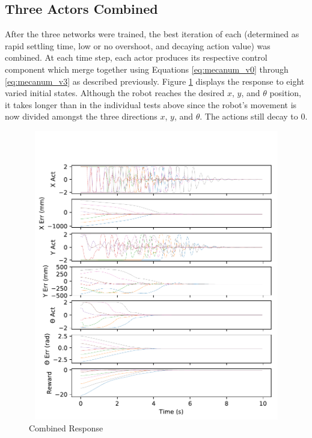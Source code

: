 \subsection{Three Actors Combined}
After the three networks were trained, the best iteration of each (determined as rapid settling time, low or no overshoot, and decaying action value) was combined. At each time step, each actor produces its respective control component which merge together using Equations \ref{eq:mecanum_v0} through \ref{eq:mecanum_v3} as described previously. Figure \ref{fig:three_actor_response} displays the response to eight varied initial states. Although the robot reaches the desired $x$, $y$, and $\theta$ position, it takes longer than in the individual tests above since the robot's movement is now divided amongst the three directions $x$, $y$, and $\theta$. The actions still decay to 0. 
\begin{figure}[H]
	\centering
	\includegraphics[width=6in, height=5in, keepaspectratio]{figures/three_actor_response.pdf}
	\caption{Combined Response} \label{fig:three_actor_response}
\end{figure}

